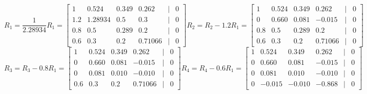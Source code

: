 \documentclass[a3paper,12pt]{extarticle} %
\begin{document}
\begin{enumerate}
\begin{enumerate}
\[        \]
        \[
        R_1 = \frac{1}{2.28934}R_1 = \begin{bmatrix}1 & 0.524 & 0.349 & 0.262 & | & 0\\1.2 & 1.28934 & 0.5 & 0.3 & | & 0\\0.8 & 0.5 & 0.289 & 0.2 & | & 0\\0.6 & 0.3 & 0.2 & 0.71066 & | & 0\end{bmatrix}
        R_2 = R_2 - 1.2R_1 = \begin{bmatrix}1 & 0.524 & 0.349 & 0.262 & | & 0\\0 & 0.660 & 0.081 & -0.015 & | & 0\\0.8 & 0.5 & 0.289 & 0.2 & | & 0\\0.6 & 0.3 & 0.2 & 0.71066 & | & 0\end{bmatrix}
        \]
        \[
        R_3 = R_3 - 0.8R_1 = \begin{bmatrix}1 & 0.524 & 0.349 & 0.262 & | & 0\\0 & 0.660 & 0.081 & -0.015 & | & 0\\0 & 0.081 & 0.010 & -0.010 & | & 0\\0.6 & 0.3 & 0.2 & 0.71066 & | & 0\end{bmatrix}
        R_4 = R_4 - 0.6R_1 = \begin{bmatrix}1 & 0.524 & 0.349 & 0.262 & | & 0\\0 & 0.660 & 0.081 & -0.015 & | & 0\\0 & 0.081 & 0.010 & -0.010 & | & 0\\0 & -0.015 & -0.010 & -0.868 & | & 0\end{bmatrix}
        \]


\end{enumerate}
\end{enumerate}
\end{document}

